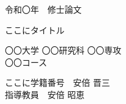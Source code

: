 \begin{titlepage}
\begin{center}

{\huge 令和〇年　修士論文}
\vspace{10mm}

{\Huge ここにタイトル}
\vspace{100mm}

{\huge 〇〇大学 〇〇研究科 〇〇専攻\\
〇〇コース}
\vspace{20mm}

{\huge ここに学籍番号　安倍 晋三}
\vspace{5mm}\\
{\huge 指導教員　安倍 昭恵}

\end{center}
\end{titlepage}
